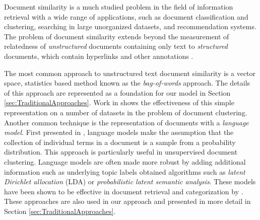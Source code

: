 \documentclass[11pt]{article}
\begin{document}
Document similarity is a much studied problem in the field of information retrieval with a wide range of applications, such as document classification and clustering, searching in large unorganized datasets, and recommendation systems. The problem of document similarity extends beyond the measurement of relatedness of \emph{unstructured} documents containing only text to \emph{structured} documents, which contain hyperlinks and other annotations \cite{Manning2008}. 

The most common approach to unstructured text document similarity is a vector space, statistics based method known as the  \emph{bag-of-words} approach. The details of this approach are represented as a foundation for our model in Section \ref{sec:TraditionalApproaches}. Work in \cite{Huang2008} shows the effectiveness of this simple representation on a number of datasets in the problem of document clustering. Another common technique is the representation of documents with a \emph{language model}. First presented in \cite{Ponte1998}, language models make the assumption that the collection of individual terms in a document is a sample from a probability distribution. This approach is particularly useful in unsupervised document clustering.  Language models are often made more robust by adding additional information such as underlying topic labels obtained algorithms such as \emph{latent Dirichlet allocation} (LDA) or \emph{probabilistic latent semantic analysis}.  These models have been shown to be effective in document retrieval and categorization by \cite{Hofmann2000}. These approaches are also used in our approach and presented in more detail in Section \ref{sec:TraditionalApproaches}. 
\end{document}
